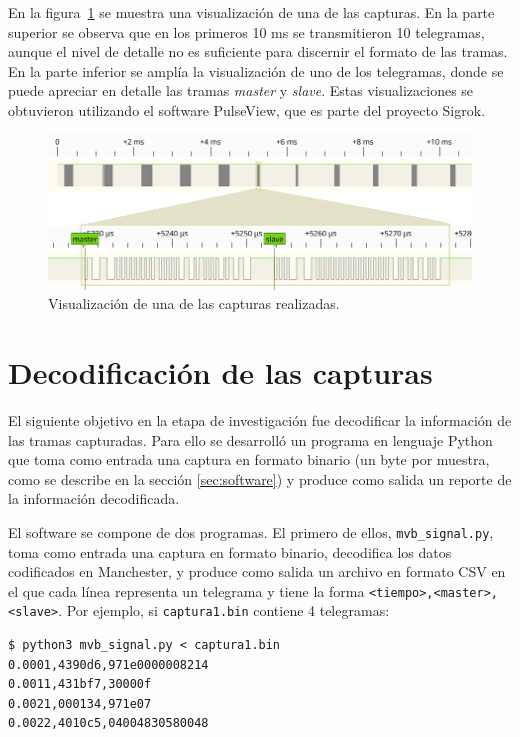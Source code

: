 En la figura~\ref{fig:pulseview} se muestra una visualización de una de las capturas.
En la parte superior se observa que en los primeros 10 ms se transmitieron 10 telegramas, aunque el nivel de detalle no es suficiente para discernir el formato de las tramas.
En la parte inferior se amplía la visualización de uno de los telegramas, donde se puede apreciar en detalle las tramas \textit{master} y \textit{slave}.
Estas visualizaciones se obtuvieron utilizando el software PulseView, que es parte del proyecto Sigrok.

\begin{figure}[htbp!]
	\centering
    \includegraphics[width=\textwidth]{./Figures/pulseview.png}
    \caption{Visualización de una de las capturas realizadas.}
    \label{fig:pulseview}
\end{figure}

\section{Decodificación de las capturas}
\label{sec:decodificacion}

El siguiente objetivo en la etapa de investigación fue decodificar la información de las tramas capturadas. Para ello se desarrolló un programa en lenguaje Python que toma como entrada una captura en formato binario (un byte por muestra, como se describe en la sección \ref{sec:software}) y produce como salida un reporte de la información decodificada.

El software se compone de dos programas. El primero de ellos, \texttt{mvb\_signal.py}, toma como entrada una captura en formato binario, decodifica los datos codificados en Manchester, y produce como salida un archivo en formato CSV en el que cada línea representa un telegrama y tiene la forma \texttt{<tiempo>,\allowbreak <master>,\allowbreak <slave>}. Por ejemplo, si \texttt{captura1.bin} contiene 4 telegramas:

\begin{lstlisting}[basicstyle=\footnotesize,breaklines=true,backgroundcolor=\color{light-gray}]
$ python3 mvb_signal.py < captura1.bin
0.0001,4390d6,971e0000008214
0.0011,431bf7,30000f
0.0021,000134,971e07
0.0022,4010c5,04004830580048
\end{lstlisting}

